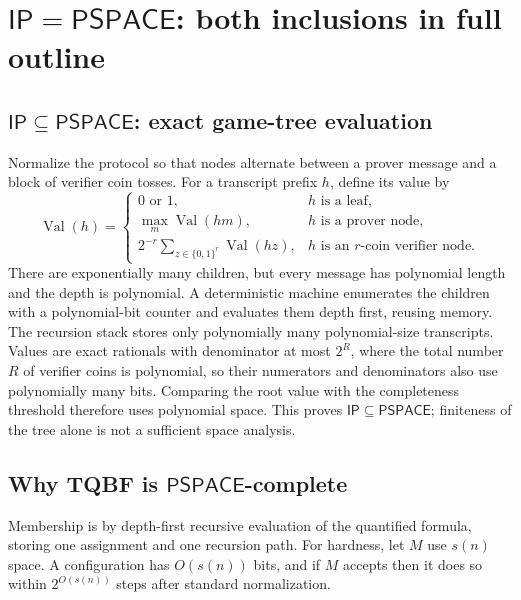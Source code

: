 \documentclass[10pt]{article}
\newcommand{\IP}{\mathsf{IP}}
\newcommand{\PSPACE}{\mathsf{PSPACE}}
\begin{document}
\section{$\IP=\PSPACE$: both inclusions in full outline}

\subsection{$\IP\subseteq\PSPACE$: exact game-tree evaluation}

Normalize the protocol so that nodes alternate between a prover message and a
block of verifier coin tosses.  For a transcript prefix $h$, define its value by
\[
 \operatorname{Val}(h)=
 \begin{cases}
  0\text{ or }1, &h\text{ is a leaf},\\
  \max_m\operatorname{Val}(hm), &h\text{ is a prover node},\\
  2^{-r}\sum_{z\in\{0,1\}^r}\operatorname{Val}(hz),
      &h\text{ is an }r\text{-coin verifier node}.
 \end{cases}
\]
There are exponentially many children, but every message has polynomial length
and the depth is polynomial.  A deterministic machine enumerates the children
with a polynomial-bit counter and evaluates them depth first, reusing memory.
The recursion stack stores only polynomially many polynomial-size transcripts.
Values are exact rationals with denominator at most $2^R$, where the total
number $R$ of verifier coins is polynomial, so their numerators and denominators
also use polynomially many bits.  Comparing the root value with the completeness
threshold therefore uses polynomial space.  This proves $\IP\subseteq\PSPACE$;
finiteness of the tree alone is not a sufficient space analysis.

\subsection{Why TQBF is $\PSPACE$-complete}

Membership is by depth-first recursive evaluation of the quantified formula,
storing one assignment and one recursion path.  For hardness, let $M$ use
$s(n)$ space.  A configuration has $O(s(n))$ bits, and if $M$ accepts then it
does so within $2^{O(s(n))}$ steps after standard normalization.
\end{document}
